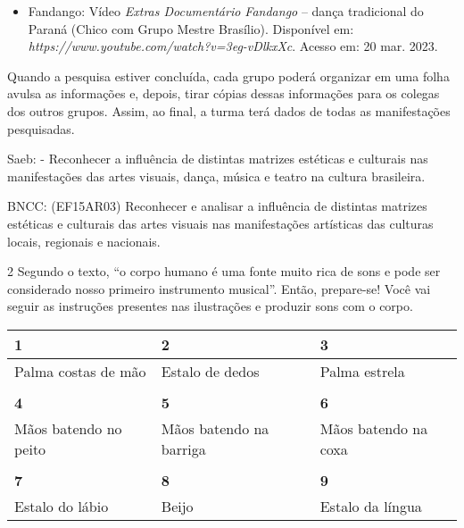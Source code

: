 {\begin{itemize}
\item Fandango: Vídeo \emph{Extras Documentário Fandango} -- dança tradicional
do Paraná (Chico com Grupo Mestre Brasílio). Disponível em: \emph{https://www.youtube.com/watch?v=3eg-vDlkxXc}. Acesso em: 20 mar. 2023.
\end{itemize}

Quando a pesquisa estiver concluída, cada grupo poderá organizar em uma
folha avulsa as informações e, depois, tirar cópias dessas informações
para os colegas dos outros grupos. Assim, ao final, a turma terá dados
de todas as manifestações pesquisadas.

Saeb: - Reconhecer a influência de distintas matrizes estéticas e
culturais nas manifestações das artes visuais, dança, música e teatro na
cultura brasileira.

BNCC: (EF15AR03) Reconhecer e analisar a influência de distintas
matrizes estéticas e culturais das artes visuais nas manifestações
artísticas das culturas locais, regionais e nacionais.}

\num{2}  Segundo o texto, ``o corpo humano é uma fonte muito rica de sons e
  pode ser considerado nosso primeiro instrumento musical''. Então,
  prepare-se! Você vai seguir as instruções presentes nas ilustrações e
  produzir sons com o corpo.


\begin{longtable}[]{@{}lll@{}}
\toprule
\textbf{1} & \textbf{2} & \textbf{3}\tabularnewline
\midrule
\endhead
Palma costas de mão & Estalo de dedos & Palma estrela\tabularnewline
& &\tabularnewline
\textbf{4} & \textbf{5} & \textbf{6}\tabularnewline
Mãos batendo no peito & Mãos batendo na barriga & Mãos batendo na
coxa\tabularnewline
& &\tabularnewline
\textbf{7} & \textbf{8} & \textbf{9}\tabularnewline
Estalo do lábio & Beijo & Estalo da língua\tabularnewline
\bottomrule
\end{longtable}


